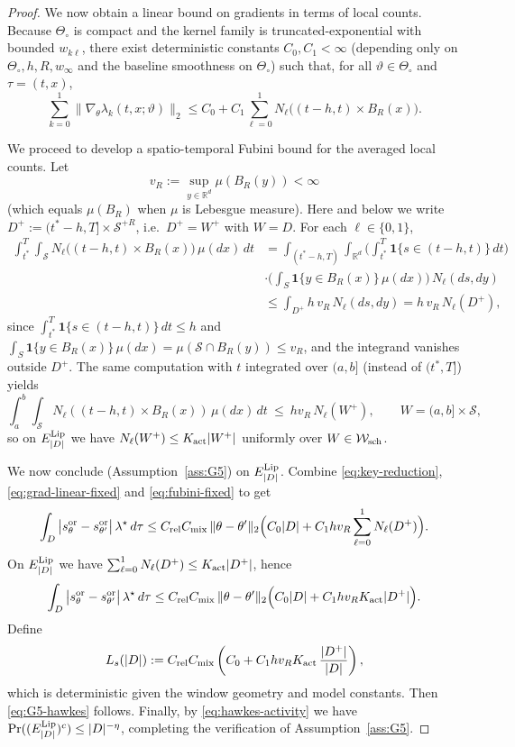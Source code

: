 \documentclass{statsoc}
\newcommand{\bbR}{\mathbb{R}}
\newcommand{\1}{\mathbbm{1}}
\begin{document}
\begin{proof}
We now obtain a linear bound on gradients in terms of local counts. Because $\Theta_\circ$ is compact and the kernel family is truncated-exponential with bounded $w_{k\ell}$,
there exist deterministic constants $C_0,C_1<\infty$ (depending only on $\Theta_\circ,h,R,w_\infty$ and the baseline
smoothness on $\Theta_\circ$) such that, for all $\vartheta\in\Theta_\circ$ and $\tau=(t,x)$,
\begin{equation}
\label{eq:grad-linear-fixed}
\sum_{k=0}^1 \|\nabla_\theta \lambda_k(t,x;\vartheta)\|_2
\le
C_0 + C_1\sum_{\ell=0}^1 N_\ell\!\big((t-h,t)\times B_R(x)\big).
\end{equation}

We proceed to develop a spatio-temporal Fubini bound for the averaged local counts. Let
\[
v_R:=\sup_{y\in\bbR^d}\mu(B_R(y))<\infty
\]
(which equals $\mu(B_R)$ when $\mu$ is Lebesgue measure). Here and below we write $D^+:=(t^\ast-h,T]\times \mathcal S^{+R}$, i.e.\ $D^+=W^+$ with $W=D$. For each $\ell\in\{0,1\}$,
\begin{align}
\int_{t^\ast}^T\int_{\mathcal{S}} N_\ell\!\big((t-h,t)\times B_R(x)\big)\,\mu(dx)\,dt
&=
\int_{(t^\ast-h,T)}\int_{\bbR^d}
\Big(\int_{t^\ast}^T \mathbf{1}\{s\in(t-h,t)\}\,dt\Big)\\ \quad&
\cdot \Big(\int_S \mathbf{1}\{y\in B_R(x)\}\,\mu(dx)\Big)\,N_\ell(ds,dy)
\nonumber\\
&\le
\int_{D^+} h\,v_R\,N_\ell(ds,dy)
=
h\,v_R\,N_\ell(D^+),
\label{eq:fubini-fixed}
\end{align}
since $\int_{t^\ast}^T \mathbf{1}\{s\in(t-h,t)\}\,dt\le h$ and
$\int_S \mathbf{1}\{y\in B_R(x)\}\,\mu(dx)=\mu(\mathcal{S}\cap B_R(y))\le v_R$,
and the integrand vanishes outside $D^+$. The same computation with $t$ integrated over $(a,b]$ (instead of $(t^\ast,T]$) yields
\[
\int_a^b\int_{\mathcal S} N_\ell((t-h,t)\times B_R(x))\,\mu(dx)\,dt
\ \le\ h v_R\,N_\ell(W^+),
\qquad W=(a,b]\times\mathcal S,
\]
so on $E^{\rm Lip}_{|D|}$ we have $N_\ell(W^+)\le K_{\rm act}|W^+|$ uniformly over $W\in\mathcal W_{\rm sch}$.


We now conclude (Assumption~\ref{ass:G5}) on $E^{\rm Lip}_{|D|}$. Combine \eqref{eq:key-reduction}, \eqref{eq:grad-linear-fixed} and \eqref{eq:fubini-fixed} to get
\[
\int_D \big|s^{\rm or}_\theta-s^{\rm or}_{\theta'}\big|\,\lambda^\star\,d\tau
\le
C_{\rm rel}C_{\rm mix}\,\|\theta-\theta'\|_2
\Big(
C_0|D| + C_1 h v_R \sum_{\ell=0}^1 N_\ell(D^+)
\Big).
\]
On $E^{\rm Lip}_{|D|}$ we have $\sum_{\ell=0}^1 N_\ell(D^+)\le K_{\rm act}|D^+|$, hence
\[
\int_D \big|s^{\rm or}_\theta-s^{\rm or}_{\theta'}\big|\,\lambda^\star\,d\tau
\le
C_{\rm rel}C_{\rm mix}\,\|\theta-\theta'\|_2
\Big(
C_0|D| + C_1 h v_R K_{\rm act}|D^+|
\Big).
\]
Define
\[
L_s(|D|)
:=C_{\rm rel}C_{\rm mix}\left(C_0 + C_1 h v_R K_{\rm act}\,\frac{|D^+|}{|D|}\right),
\]
which is deterministic given the window geometry and model constants. Then \eqref{eq:G5-hawkes} follows.
Finally, by \eqref{eq:hawkes-activity} we have $\Pr((E^{\rm Lip}_{|D|})^c)\le |D|^{-\eta}$, completing the verification of Assumption~\ref{ass:G5}.
\end{proof}
\end{document}
